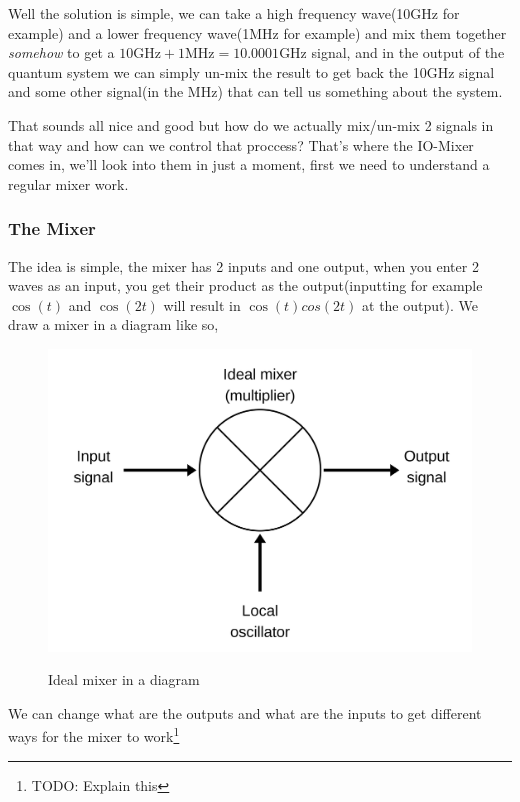 \documentclass[english, a4paper, 12pt, twoside]{article}
\numberwithin{equation}{section} %
\begin{document}
Well the solution is simple, we can take a high frequency wave(10GHz for example) and a lower frequency wave(1MHz for example) and mix them together \textit{somehow} to get a $10\text{GHz} + 1\text{MHz} = 10.0001\text{GHz}$ signal, and in the output of the quantum system we can simply un-mix the result to get back the 10GHz signal and some other signal(in the MHz) that can tell us something about the system.

That sounds all nice and good but how do we actually mix/un-mix 2 signals in that way and how can we control that proccess? That's where the IO-Mixer comes in, we'll look into them in just a moment, first we need to understand a regular mixer work.

\subsubsection{The Mixer}
The idea is simple, the mixer has 2 inputs and one output, when you enter 2 waves as an input, you get their product as the output(inputting for example $\cos(t)$ and $\cos(2t)$ will result in $\cos(t)cos(2t)$ at the output). %
We draw a mixer in a diagram like so,

\begin{figure}[H]
    \centering
    \caption{Ideal mixer in a diagram}
    \includegraphics[width=0.3\columnwidth]{Ideal-Mixer.png} %
    \label{fig:Ideal-Mixer}
\end{figure}
We can change what are the outputs and what are the inputs to get different ways for the mixer to work\footnote{TODO: Explain this} %
\end{document}
